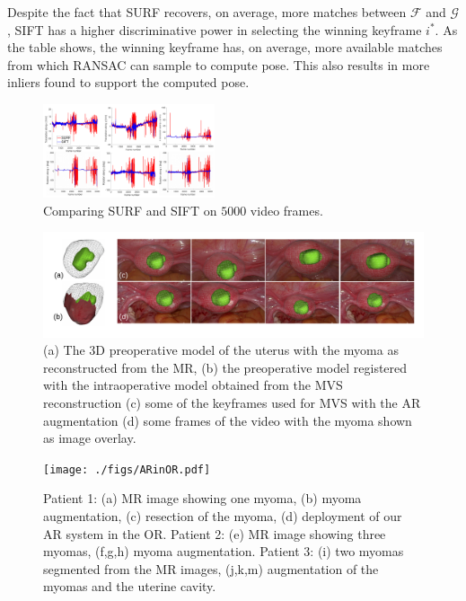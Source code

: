 Despite the fact that SURF recovers, on average, more matches between $\mathcal{F}$ and $\mathcal{G}$, SIFT has a higher discriminative power in selecting the winning keyframe $i^*$.
As the table shows, the winning keyframe has, on average, more available matches from which RANSAC can sample to compute pose.
This also results in more inliers found to support the computed pose.
\begin{figure}[t]
  \centering
  \includegraphics[width=0.45\textwidth]{./figs/Stability_Features2.pdf}
\caption{Comparing SURF and SIFT on $5000$ video frames.}
\label{fig:SurfVsSift}
\vspace{-5mm}
\end{figure}
\begin{figure}[ht]
  \centering
  \includegraphics[width=0.99\columnwidth]{./figs/frames_aug_new.pdf}
\caption{(a) The 3D preoperative model of the uterus with the  myoma as reconstructed from the MR, (b) the preoperative model registered with the intraoperative model obtained from the MVS reconstruction (c) some of the keyframes used for MVS with the AR augmentation  (d) some frames of the video with the myoma shown as image overlay.}
\label{fig:myomas}
\vspace{-5mm}
\end{figure}
\begin{figure}[ht]
  \centering
  \texttt{[image: ./figs/ARinOR.pdf]}
\caption{Patient 1: (a) MR image showing one myoma, (b) myoma augmentation, (c) resection of the myoma, (d) deployment of our AR system in the OR. Patient 2: (e) MR image showing three myomas, (f,g,h) myoma augmentation. Patient 3: (i) two myomas segmented from the MR images, (j,k,m) augmentation of the myomas and the uterine cavity.}
\label{fig:realOR}
\end{figure}
